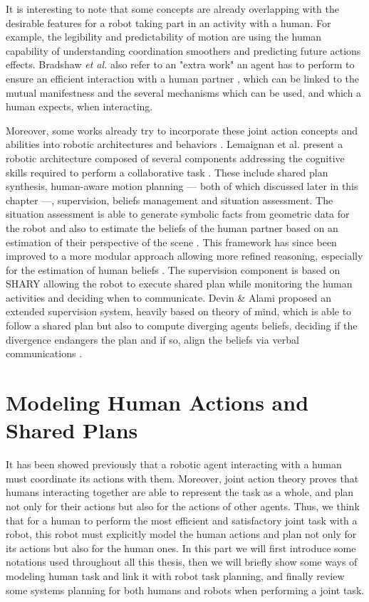 \documentclass[a4paper,11pt,twoside]{StyleThese}
\begin{document}
It is interesting to note that some concepts are already overlapping with the desirable features for a robot taking part in an activity with a human. For example, the legibility and predictability of motion are using the human capability of understanding coordination smoothers and predicting future actions effects. Bradshaw \textit{et al.} also refer to an "extra work" an agent has to perform to ensure an efficient interaction with a human partner \cite{bradshaw2003adjustable}, which can be linked to the mutual manifestness and the several mechanisms which can be used, and which a human expects, when interacting.

Moreover, some works already try to incorporate these joint action concepts and abilities into robotic architectures and behaviors \cite{khamassi2016integration, clodic2017key}. Lemaignan et al. present a robotic architecture composed of several components addressing the cognitive skills required to perform a collaborative task \cite{lemaignan2017artificial}. These include shared plan synthesis, human-aware motion planning --- both of which discussed later in this chapter ---, supervision, beliefs management and situation assessment. The situation assessment is able to generate symbolic facts from geometric data for the robot and also to estimate the beliefs of the human partner based on an estimation of their perspective of the scene \cite{milliez2014framework}. This framework has since been improved to a more modular approach allowing more refined reasoning, especially for the estimation of human beliefs \cite{lemaignan2018underworlds}. The supervision component is based on SHARY \cite{clodic2009shary} allowing the robot to execute shared plan while monitoring the human activities and deciding when to communicate. Devin \& Alami proposed an extended supervision system, heavily based on theory of mind, which is able to follow a shared plan but also to compute diverging agents beliefs, deciding if the divergence endangers the plan and if so, align the beliefs via verbal communications \cite{devin2016implemented}.

\section{Modeling Human Actions and Shared Plans}

It has been showed previously that a robotic agent interacting with a human must coordinate its actions with them. Moreover, joint action theory proves that humans interacting together are able to represent the task as a whole, and plan not only for their actions but also for the actions of other agents. Thus, we think that for a human to perform the most efficient and satisfactory joint task with a robot, this robot must explicitly model the human actions and plan not only for its actions but also for the human ones. In this part we will first introduce some notations used throughout all this thesis, then we will briefly show some ways of modeling human task and link it with robot task planning, and finally review some systems planning for both humans and robots when performing a joint task.
\end{document}
